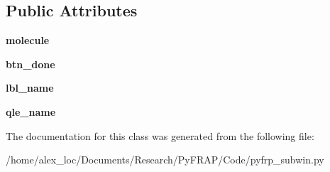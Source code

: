 \subsection*{Public Attributes}
\begin{DoxyCompactItemize}
\item 
\hypertarget{classpyfrp__subwin_1_1molecule__dialog_ac726a073ac83f2a248c0bc93f2aab33a}{{\bfseries molecule}}\label{classpyfrp__subwin_1_1molecule__dialog_ac726a073ac83f2a248c0bc93f2aab33a}

\item 
\hypertarget{classpyfrp__subwin_1_1molecule__dialog_a0cb1129b780638d4ea04538791ec96ea}{{\bfseries btn\+\_\+done}}\label{classpyfrp__subwin_1_1molecule__dialog_a0cb1129b780638d4ea04538791ec96ea}

\item 
\hypertarget{classpyfrp__subwin_1_1molecule__dialog_acac4040555c3901e2e5973c47ef2aa99}{{\bfseries lbl\+\_\+name}}\label{classpyfrp__subwin_1_1molecule__dialog_acac4040555c3901e2e5973c47ef2aa99}

\item 
\hypertarget{classpyfrp__subwin_1_1molecule__dialog_a2f02990203d941fd588c633e58d03d5d}{{\bfseries qle\+\_\+name}}\label{classpyfrp__subwin_1_1molecule__dialog_a2f02990203d941fd588c633e58d03d5d}

\end{DoxyCompactItemize}


The documentation for this class was generated from the following file\+:\begin{DoxyCompactItemize}
\item 
/home/alex\+\_\+loc/\+Documents/\+Research/\+Py\+F\+R\+A\+P/\+Code/pyfrp\+\_\+subwin.\+py\end{DoxyCompactItemize}
